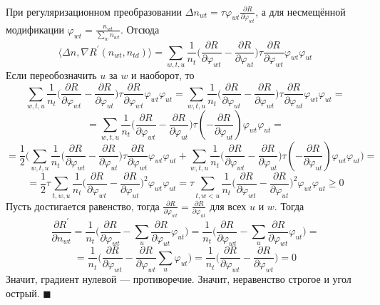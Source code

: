 \documentclass[12pt]{article}
\newenvironment{Proof} 
	{\par\noindent{\bf Доказательство.}} 
	{\hfill$\blacksquare$}
\renewcommand{\geq}{\geqslant}
\renewcommand{\phi}{\varphi}
\begin{document}
\begin{Proof}\\
При регуляризационном преобразовании $\Delta n_{wt} = \tau \phi_{wt} \frac{\partial{R}}{\partial{\phi_{wt}}}$, а для несмещённой модификации $\phi_{wt} = \frac{n_{wt}}{\sum\limits_w n_{wt}}$. Отсюда
\[
\langle \Delta n, \nabla R^{\prime}(n_{wt}, n_{td})\rangle = \sum\limits_{w, t, u}  \frac{1}{n_{t}}  \bigg(  \frac{\partial{R}}{\partial{\phi_{wt}}}  -  \frac{\partial{R}}{\partial{\phi_{ut}}}  \bigg)  \tau \frac{\partial{R}}{\partial{\phi_{wt}}} \phi_{wt} \phi_{ut}
\]
Если переобозначить $u$ за $w$ и наоборот, то 
\[
\sum\limits_{w, t, u}  \frac{1}{n_{t}}  \bigg(  \frac{\partial{R}}{\partial{\phi_{wt}}}  -  \frac{\partial{R}}{\partial{\phi_{ut}}}  \bigg)  \tau \frac{\partial{R}}{\partial{\phi_{wt}}} \phi_{wt} \phi_{ut}  = \sum\limits_{w, t, u}  \frac{1}{n_{t}}  \bigg(  \frac{\partial{R}}{\partial{\phi_{ut}}}  -  \frac{\partial{R}}{\partial{\phi_{wt}}}  \bigg)  \tau \frac{\partial{R}}{\partial{\phi_{ut}}} \phi_{wt} \phi_{ut} = 
\]
\[
= \sum\limits_{w, t, u}  \frac{1}{n_{t}}  \bigg(  \frac{\partial{R}}{\partial{\phi_{wt}}}  -  \frac{\partial{R}}{\partial{\phi_{ut}}}  \bigg)  \tau \left(-\frac{\partial{R}}{\partial{\phi_{ut}}}\right) \phi_{wt} \phi_{ut} = 
\]
\[
= \frac12 \bigg(\sum\limits_{w, t, u}  \frac{1}{n_{t}}  \bigg(  \frac{\partial{R}}{\partial{\phi_{wt}}}  -  \frac{\partial{R}}{\partial{\phi_{ut}}}  \bigg)  \tau \frac{\partial{R}}{\partial{\phi_{wt}}} \phi_{wt} \phi_{ut} +  \sum\limits_{w, t, u}  \frac{1}{n_{t}}  \bigg(  \frac{\partial{R}}{\partial{\phi_{wt}}}  -  \frac{\partial{R}}{\partial{\phi_{ut}}}  \bigg)  \tau \left(-\frac{\partial{R}}{\partial{\phi_{ut}}}\right) \phi_{wt} \phi_{ut} \bigg)= 
\]
\[
= \frac12 \tau \sum\limits_{t, w, u}  \frac{1}{n_{t}} \bigg(  \frac{\partial{R}}{\partial{\phi_{wt}}}  -  \frac{\partial{R}}{\partial{\phi_{ut}}}  \bigg)^2 \phi_{wt} \phi_{ut} = \tau \sum\limits_{t, w < u}  \frac{1}{n_{t}} \bigg(  \frac{\partial{R}}{\partial{\phi_{wt}}}  -  \frac{\partial{R}}{\partial{\phi_{ut}}}  \bigg)^2 \phi_{wt} \phi_{ut} \geq 0
\]
Пусть достигается равенство, тогда $\frac{\partial{R}}{\partial{\phi_{wt}}}  =  \frac{\partial{R}}{\partial{\phi_{ut}}}$ для всех $u$ и $w$. Тогда
\[
\frac{\partial{R^{\prime}}}{\partial{n_{wt}}} = \frac{1}{n_t} \bigg( \frac{\partial{R}}{\partial{\phi_{wt}}} - \sum_{u}  \frac{\partial{R}}{\partial{\phi_{ut}}} \phi_{ut} \bigg) = \frac{1}{n_t} \bigg( \frac{\partial{R}}{\partial{\phi_{wt}}} - \sum_{u}  \frac{\partial{R}}{\partial{\phi_{wt}}} \phi_{ut} \bigg) =
\]
\[
=\frac{1}{n_t} \bigg( \frac{\partial{R}}{\partial{\phi_{wt}}} - \frac{\partial{R}}{\partial{\phi_{wt}}} \sum_{u} \phi_{ut} \bigg)  = \frac{1}{n_t} \bigg( \frac{\partial{R}}{\partial{\phi_{wt}}} - \frac{\partial{R}}{\partial{\phi_{wt}}} \bigg) = 0
\]
Значит, градиент нулевой --- противоречие. Значит, неравенство строгое и угол острый.
\end{Proof}\ \\
\end{document}
